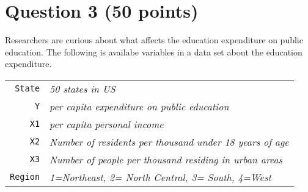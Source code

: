 \documentclass[12pt,letterpaper]{article}
\begin{document}
\vspace{1cm}
	\section*{Question 3 (50 points)}

\vspace{.5cm}
  
\vspace{.5cm}
\noindent Researchers are curious about what affects the education expenditure on public education. The following is availabe variables in a data set about the education expenditure. \\
\vspace{.5cm}







\begin{tabular}{r|l}
	\texttt{State} &\emph{50 states in US} \\
	\texttt{Y} & \emph{per capita expenditure on public education}\\
	\texttt{X1} &\emph{per capita personal income} \\
	\texttt{X2} &  \emph{Number of residents per thousand under 18 years of age}\\
	\texttt{X3} &  \emph{Number of people per thousand residing in urban areas} \\
	\texttt{Region} &  \emph{1=Northeast, 2= North Central, 3= South, 4=West} \\

\end{tabular}
\end{document}
